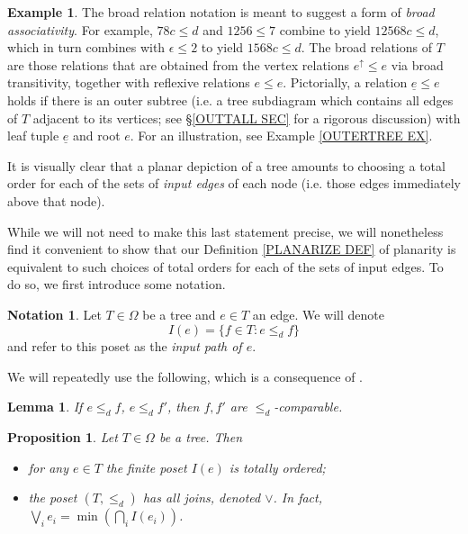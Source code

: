 \documentclass[a4paper,10pt
,draft
]{article}%
\numberwithin{equation}{section}
\numberwithin{figure}{section}
\newtheorem{lemma}[equation]{Lemma}%
\newtheorem{proposition}[equation]{Proposition}%
\theoremstyle{definition} %
\newtheorem{example}[equation]{Example}%
\newtheorem{notation}[equation]{Notation}%
\newcommand{\1}{\ensuremath{\mathbbm 1}}%
\begin{document}
\begin{example}
The broad relation notation is meant to suggest a form of 
\emph{broad associativity}. For example,
$78c \leq d$ and $1256 \leq 7$ combine to yield
$12568c \leq d$,
which
in turn combines with $\epsilon \leq 2$
to yield $1568c \leq d$.
The broad relations of $T$ are those relations that are obtained from the vertex relations $e^{\uparrow} \leq e$
via broad transitivity, together with reflexive relations
$e \leq e$.
Pictorially, a relation 
$\underline{e} \leq e$ holds 
if there is an outer subtree
(i.e. a tree subdiagram 
which contains all edges of $T$ adjacent to its vertices;
see \S \ref{OUTTALL SEC} for a rigorous discussion)
with leaf tuple 
$\underline{e}$ and root $e$.
For an illustration, see Example \ref{OUTERTREE EX}.
\end{example}


It is visually clear that a planar depiction of a tree amounts to choosing a total order for each of the sets of \textit{input edges} of each node (i.e. those edges immediately above that node).

While we will not need to make this last statement precise, we will nonetheless find it convenient to show that our Definition \ref{PLANARIZE DEF} of planarity is equivalent to such choices of total orders for each of the sets of input edges.
To do so, we first introduce some notation.


\begin{notation}\label{INPUTPATH NOT}
	Let $T \in \Omega$ be a tree and $e \in T$ an edge. We will denote
	\[ I(e) =\{f \in T \colon e \leq_d f \} \]
and refer to this poset as the \textit{input path of $e$}.
\end{notation}

We will repeatedly use the following, which is a consequence of \cite[Cor. 5.26]{Pe17}.

\begin{lemma}\label{INCOMPNOTOP}
If $e \leq_d f$, $e \leq_d f'$, then $f,f'$ are $\leq_d$-comparable. 
\end{lemma}


\begin{proposition}\label{INPUTPATHS PROP}
	Let $T \in \Omega$ be a tree. Then
	\begin{itemize}
		\item[(a)] for any $e \in T$ the finite poset $I(e)$ is totally ordered;
		\item[(b)] the poset $(T,\leq_d)$ has all joins, denoted $\vee$. In fact, $\bigvee_{i} e_i = \min (\bigcap_{i} I(e_i))$.
	\end{itemize}
\end{proposition}
\end{document}
